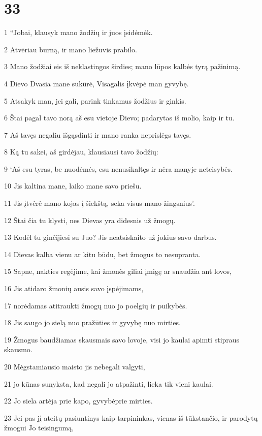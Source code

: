 \chapter{33}

\par 1 “Jobai, klausyk mano žodžių ir juos įsidėmėk. 
\par 2 Atvėriau burną, ir mano liežuvis prabilo. 
\par 3 Mano žodžiai eis iš neklastingos širdies; mano lūpos kalbės tyrą pažinimą. 
\par 4 Dievo Dvasia mane sukūrė, Visagalis įkvėpė man gyvybę. 
\par 5 Atsakyk man, jei gali, parink tinkamus žodžius ir ginkis. 
\par 6 Štai pagal tavo norą aš esu vietoje Dievo; padarytas iš molio, kaip ir tu. 
\par 7 Aš tavęs negaliu išgąsdinti ir mano ranka neprislėgs tavęs. 
\par 8 Ką tu sakei, aš girdėjau, klausiausi tavo žodžių: 
\par 9 ‘Aš esu tyras, be nuodėmės, esu nenusikaltęs ir nėra manyje neteisybės. 
\par 10 Jis kaltina mane, laiko mane savo priešu. 
\par 11 Jis įtvėrė mano kojas į šiekštą, seka visus mano žingsnius’. 
\par 12 Štai čia tu klysti, nes Dievas yra didesnis už žmogų. 
\par 13 Kodėl tu ginčijiesi su Juo? Jis neatsiskaito už jokius savo darbus. 
\par 14 Dievas kalba vienu ar kitu būdu, bet žmogus to nesupranta. 
\par 15 Sapne, nakties regėjime, kai žmonės giliai įmigę ar snaudžia ant lovos, 
\par 16 Jis atidaro žmonių ausis savo įspėjimams, 
\par 17 norėdamas atitraukti žmogų nuo jo poelgių ir puikybės. 
\par 18 Jis saugo jo sielą nuo pražūties ir gyvybę nuo mirties. 
\par 19 Žmogus baudžiamas skausmais savo lovoje, visi jo kaulai apimti stipraus skausmo. 
\par 20 Mėgstamiausio maisto jis nebegali valgyti, 
\par 21 jo kūnas sunyksta, kad negali jo atpažinti, lieka tik vieni kaulai. 
\par 22 Jo siela artėja prie kapo, gyvybė­prie mirties. 
\par 23 Jei pas jį ateitų pasiuntinys kaip tarpininkas, vienas iš tūkstančio, ir parodytų žmogui Jo teisingumą, 
